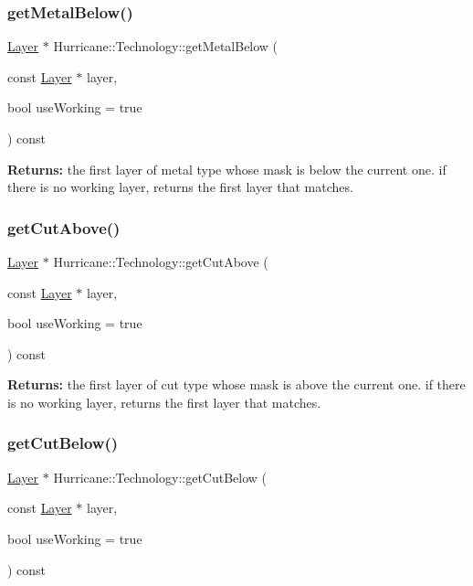 \subsubsection{\texorpdfstring{get\+Metal\+Below()}{getMetalBelow()}}
{\footnotesize\ttfamily \mbox{\hyperlink{classHurricane_1_1Layer}{Layer}} $\ast$ Hurricane\+::\+Technology\+::get\+Metal\+Below (\begin{DoxyParamCaption}\item[{const \mbox{\hyperlink{classHurricane_1_1Layer}{Layer}} $\ast$}]{layer,  }\item[{bool}]{use\+Working = {\ttfamily true} }\end{DoxyParamCaption}) const}

{\bfseries Returns\+:} the first layer of metal type whose mask is below the current one. if there is no working layer, returns the first layer that matches. \mbox{\label{classHurricane_1_1Technology_ac7125a8eea871918e74bb295c56caceb}} 
\subsubsection{\texorpdfstring{get\+Cut\+Above()}{getCutAbove()}}
{\footnotesize\ttfamily \mbox{\hyperlink{classHurricane_1_1Layer}{Layer}} $\ast$ Hurricane\+::\+Technology\+::get\+Cut\+Above (\begin{DoxyParamCaption}\item[{const \mbox{\hyperlink{classHurricane_1_1Layer}{Layer}} $\ast$}]{layer,  }\item[{bool}]{use\+Working = {\ttfamily true} }\end{DoxyParamCaption}) const}

{\bfseries Returns\+:} the first layer of cut type whose mask is above the current one. if there is no working layer, returns the first layer that matches. \mbox{\label{classHurricane_1_1Technology_a3ca39dccc7e19b404181f55777e1b933}} 
\subsubsection{\texorpdfstring{get\+Cut\+Below()}{getCutBelow()}}
{\footnotesize\ttfamily \mbox{\hyperlink{classHurricane_1_1Layer}{Layer}} $\ast$ Hurricane\+::\+Technology\+::get\+Cut\+Below (\begin{DoxyParamCaption}\item[{const \mbox{\hyperlink{classHurricane_1_1Layer}{Layer}} $\ast$}]{layer,  }\item[{bool}]{use\+Working = {\ttfamily true} }\end{DoxyParamCaption}) const}

